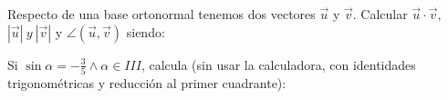\documentclass[addpoints,spanish, 12pt,a4paper]{exam}
\begin{document}
        \begin{questions}
        \question Respecto de una base ortonormal tenemos dos vectores $\overrightarrow{u}$ y $\overrightarrow{v}$.
Calcular $\overrightarrow{u}\cdot\overrightarrow{v}$, $|\overrightarrow{u}| \ y \ |\overrightarrow{v}|$ 
y $\angle(\overrightarrow{u},\overrightarrow{v})$ siendo:
        \begin{multicols}{1} 
        \end{multicols}
        \question Si $\sin\alpha=-\frac{3}{5}\land \alpha \in III$, calcula (sin usar la calculadora, con identidades trigonométricas y reducción al primer cuadrante):
        \begin{multicols}{1} 
\end{multicols}
\end{questions}
\end{document}
